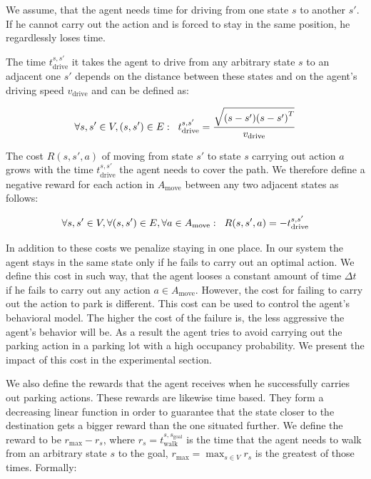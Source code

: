 We assume, that the agent needs time for driving from one state $s$ to another
$s'$. If he cannot carry out the action and is forced to stay in the same
position, he regardlessly loses time.

The time $t^{s, s'}_\mathrm{drive}$ it takes the agent to drive from any arbitrary state $s$ to an
adjacent one $s'$ depends on the distance between these states and on the
agent's driving speed $v_{\mathrm{drive}}$ and can be defined as:

\begin{equation}
\label{eq:time_to_drive}
\forall s,s' \in V, (s, s') \in E: \hspace{2mm} t_{\mathrm{drive}}^{s,s'}
= \frac{\sqrt{(s - s') {(s - s')}^T}}{v_{\mathrm{drive}}}
\end{equation}

The cost $R(s, s', a)$ of moving from state $s'$ to state $s$ carrying out
action $a$ grows with the time $t_{\mathrm{drive}}^{s,s'}$ the agent needs to
cover the path. We therefore define a negative reward for each action in
$A_{\mathrm{move}}$ between any two adjacent states as follows:

\begin{equation}
\label{eq:drive_reward}
\forall s,s' \in V, \forall (s, s') \in E, \forall a \in A_{\mathrm{move}}: \hspace{2mm} R(s, s', a) = -t_{\mathrm{drive}}^{s,s'}
\end{equation}

In addition to these costs we penalize staying in one place. In our system the
agent stays in the same state only if he fails to carry out an optimal action.
We define this cost in such way, that the agent looses a constant amount of
time $\Delta t$ if he fails to carry out any action $a \in A_\mathrm{move}$.
However, the cost for failing to carry out the action to park is different.
This cost can be used to control the agent's behavioral model. The higher the
cost of the failure is, the less aggressive the agent's behavior will be. As a
result the agent tries to avoid carrying out the parking action in a parking
lot with a high occupancy probability. We present the impact of this cost in
the experimental section.

We also define the rewards that the agent receives when he successfully
carries out parking actions. These rewards are likewise time based. They form
a decreasing linear function in order to guarantee that the state closer to
the destination gets a bigger reward than the one situated further. We define
the reward to be $r_{\max} - r_s$, where $r_s =
t_{\mathrm{walk}}^{s,s_{\mathrm{goal}}}$ is the time that the agent needs to
walk from an arbitrary state $s$ to the goal, $r_{\max} = \max_{s \in V}r_s$
is the greatest of those times. Formally:

